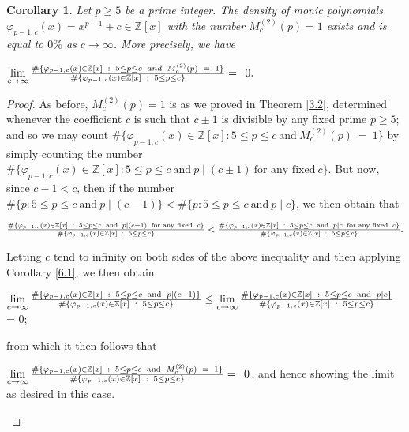 \documentclass{article}
\theoremstyle{plain}
\newtheorem{cor}[thm]{Corollary}
\theoremstyle{definition}
\begin{document}
\begin{cor}\label{6.2}
Let $p\geq 5$ be a prime integer. The density of monic polynomials $\varphi_{p-1,c}(x)=x^{p-1}+c\in \mathbb{Z}[x]$ with the number $M_{c}^{(2)}(p) = 1$ exists and is equal to $0\%$ as $c\to \infty$. More precisely, we have  
\begin{center}
    $\lim\limits_{c\to\infty} \Large{\frac{\# \{\varphi_{p-1,c}(x) \in \mathbb{Z}[x]\ : \ 5\leq p\leq c \ and \ M_{c}^{(2)}(p) \ = \ 1\}}{\Large{\# \{\varphi_{p-1,c}(x) \in \mathbb{Z}[x]\ : \ 5\leq p\leq c \}}}} = \ 0.$
\end{center}
\end{cor}
\begin{proof}
As before, $M_{c}^{(2)}(p) = 1$ is as we proved in Theorem \ref{3.2}, determined whenever the coefficient $c$ is such that $c\pm1$ is divisible by any fixed prime $p\geq 5$; and so we may count $\# \{\varphi_{p-1,c}(x) \in \mathbb{Z}[x] : 5\leq p\leq c \ \text{and} \ M_{c}^{(2)}(p) \ = \ 1\}$ by simply counting the number $\# \{\varphi_{p-1,c}(x)\in \mathbb{Z}[x] : 5\leq p\leq c \ \text{and} \ p\mid (c\pm1) \ \text{for \ any \ fixed} \ c \}$. But now, since $c-1<c$, then if the number $\# \{p : 5\leq p\leq c \ \text{and} \ p\mid (c-1) \}< \# \{p : 5\leq p\leq c \ \text{and} \ p\mid c \}$, we then obtain that
\begin{center}
$\Large{\frac{\# \{\varphi_{p-1,c}(x) \in \mathbb{Z}[x] \ : \ 5\leq p\leq c \ \text{and} \ p\mid (c-1) \ \text{for any fixed} \ c\}}{\Large{\# \{\varphi_{p-1,c}(x) \in \mathbb{Z}[x] \ : \ 5\leq p\leq c \}}}} < \Large{\frac{\# \{\varphi_{p-1,c}(x)\in \mathbb{Z}[x] \ : \ 5\leq p\leq c \ \text{and} \ p\mid c \ \text{for any fixed} \ c \}}{\Large{\# \{\varphi_{p-1,c}(x) \in \mathbb{Z}[x] \ : \ 5\leq p\leq c \}}}}.$ 
\end{center}Letting $c$ tend to infinity on both sides of the above inequality and then applying Corollary \ref{6.1}, we then obtain 
\begin{center}
$\lim\limits_{c\to\infty}\Large{\frac{\# \{\varphi_{p-1,c}(x) \in \mathbb{Z}[x] \ : \ 5\leq p\leq c \ \text{and} \ p\mid (c-1)\}}{\Large{\# \{\varphi_{p-1,c}(x) \in \mathbb{Z}[x] \ : \ 5\leq p\leq c \}}}} \leq \lim\limits_{c\to\infty}\Large{\frac{\# \{\varphi_{p-1,c}(x)\in \mathbb{Z}[x] \ : \ 5\leq p\leq c \ \text{and} \ p\mid c  \}}{\Large{\# \{\varphi_{p-1,c}(x) \in \mathbb{Z}[x] \ : \ 5\leq p\leq c \}}}}$ = 0; 
\end{center} from which it then follows that 
\begin{center}
    $\lim\limits_{c\to\infty} \Large{\frac{\# \{\varphi_{p-1,c}(x) \in \mathbb{Z}[x]\ : \ 5\leq p\leq c \ \text{and} \ M_{c}^{(2)}(p) \ = \ 1\}}{\Large{\# \{\varphi_{p-1,c}(x) \in \mathbb{Z}[x]\ : \ 5\leq p\leq c \}}}} = \ 0$, and hence showing the limit as desired in this case.

\end{center}
\end{proof}
\end{document}
